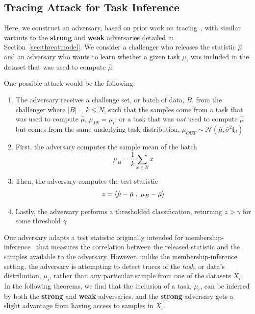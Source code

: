 \subsection{Tracing Attack for Task Inference} \label{sec:tracing}

Here, we construct an adversary, based on prior work on tracing~\cite{dwork-2015-trace}, with similar variants to the \textbf{strong} and \textbf{weak} adversaries detailed in Section~\ref{sec:threatmodel}. We consider a challenger who releases the statistic $\hat{\mu}$ and an adversary who wants to learn whether a given task $\mu_i$ was included in the dataset that was used to compute $\hat{\mu}$.

\noindent One possible attack would be the following:

\begin{enumerate}[labelsep=*,leftmargin=15pt]
    \item The adversary receives a challenge set, or batch of data, $B$, from the challenger where $| B | = k \leq N$, such that the samples come from a task that was used to compute $\hat{\mu}$, $\mu_{IN} = \mu_i$, or a task that was \emph{not} used to compute $\hat{\mu}$ but comes from the same underlying task distribution, $\mu_{OUT} \sim \mathcal{N}(\bar{\mu}, \bar{\sigma}^2 \mathbb{I}_d)$
    \item First, the adversary computes the sample mean of the batch
    \[
    \mu_{B} = \frac{1}{k} \sum_{x \in B}{x} 
    \]
    \item Then, the adversary computes the test statistic
    \[
    z = \langle \hat{\mu} - \Bar{\mu} \; , \; \mu_B - \Bar{\mu} \rangle
    \]
    \item Lastly, the adversary performs a thresholded classification, returning $z > \gamma$ for some threshold $\gamma$
\end{enumerate}

Our adversary adapts a test statistic originally intended for membership-inference~\cite{dwork-2015-trace} that measures the correlation between the released statistic and the samples available to the adversary. However, unlike the membership-inference setting, the adversary is attempting to detect traces of the \textit{task}, or data's distribution, $\mu_i$, rather than any particular sample from one of the datasets $X_i$. In the following theorems, we find that the inclusion of a task, $\mu_i$, can be inferred by both the \textbf{strong} and \textbf{weak} adversaries, and the \textbf{strong} adversary gets a slight advantage from having access to samples in $X_i$.


